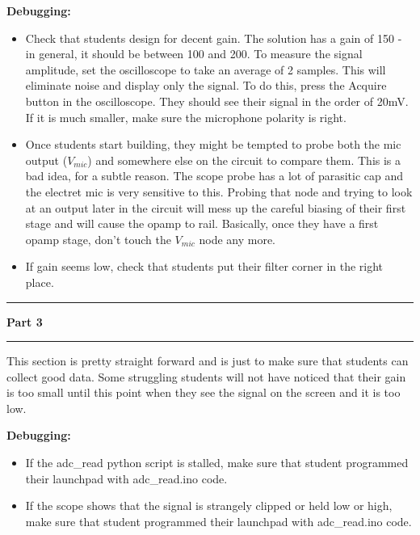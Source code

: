 \documentclass[11pt]{article}
\newcommand\header[1]{\vspace{.25in}\hrule\textbf{#1}\vspace{.5em}\hrule\vspace{.10in}}
\begin{document}
\textbf{Debugging:} 
\begin{itemize}
    \item Check that students design for decent gain. The solution has a gain of 150 - in general, it should be between 100 and 200. To measure the signal amplitude, set the oscilloscope to take an average of 2 samples. This will eliminate noise and display only the signal. To do this, press the Acquire button in the oscilloscope. They should see their signal in the order of 20mV. If it is much smaller, make sure the microphone polarity is right.
    \item Once students start building, they might be tempted to probe both the mic output ($V_{mic}$) and somewhere else on the circuit to compare them. This is a bad idea, for a subtle reason. The scope probe has a lot of parasitic cap and the electret mic is very sensitive to this. Probing that node and trying to look at an output later in the circuit will mess up the careful biasing of their first stage and will cause the opamp to rail. Basically, once they have a first opamp stage, don't touch the $V_{mic}$ node any more.

    \item If gain seems low, check that students put their filter corner in the right place.
\end{itemize}

\header{Part 3}
This section is pretty straight forward and is just to make sure that students can collect good data. Some struggling students will not have noticed that their gain is too small until this point when they see the signal on the screen and it is too low.

\textbf{Debugging:} 
\begin{itemize}
    \item If the adc\_read python script is stalled, make sure that student programmed their launchpad with adc\_read.ino code.
    \item If the scope shows that the signal is strangely clipped or held low or high, make sure that student programmed their launchpad with adc\_read.ino code.
\end{itemize}
\end{document}
